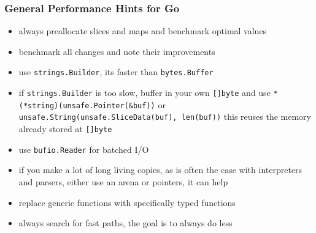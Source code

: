    \subsubsection*{General Performance Hints for Go}
    \begin{itemize}
        \item always preallocate slices and maps and benchmark optimal values
        \item benchmark all changes and note their improvements \item use
            \texttt{strings.Builder}, its faster than
            \texttt{bytes.Buffer} \item if
            \texttt{strings.Builder} is too slow, buffer in your own
            \texttt{[]byte} and use
            \texttt{*(*string)(unsafe.Pointer(&buf))} or
            \texttt{unsafe.String(unsafe.SliceData(buf), len(buf))}
            this reuses the memory already stored at \texttt{[]byte}
        \item use \texttt{bufio.Reader} for batched I/O
        \item if you make a lot of long living copies, as is often the case
            with interpreters and parsers, either use an arena or pointers, it
            can help
        \item replace generic functions with specifically typed functions
        \item always search for fast paths, the goal is to always do less
    \end{itemize}


